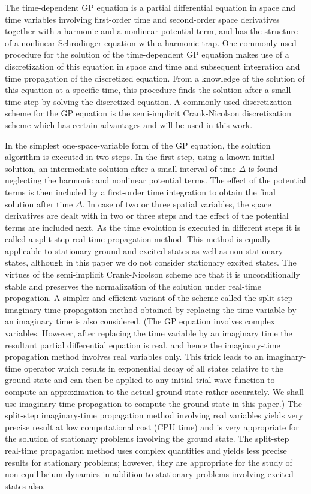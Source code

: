 \documentclass[onecolumn]{elsart3p}
\begin{document}
The time-dependent GP equation is a partial differential equation in space and
time variables involving first-order time and second-order space derivatives
together with a harmonic and a nonlinear potential term, and has the structure
of a nonlinear Schr\"odinger equation with a harmonic trap. { One
commonly used} procedure for the solution of the time-dependent GP equation makes
use of a discretization of this equation in space and time  and subsequent
integration and time propagation of the discretized equation. From a knowledge
of the solution of this equation at a specific time, this procedure finds the
solution after a small time step by solving the discretized equation.
{A commonly used} discretization scheme for the GP equation is the
semi-implicit Crank-Nicolson discretization scheme \cite{koonin,ames,dtray}
which has certain advantages and will be used in this work.


In the simplest one-space-variable form of the GP  equation, the solution
algorithm is executed in two steps. In the first step, using a known initial
solution, an intermediate solution  after a small interval of time $\Delta$ is
found   neglecting the harmonic and  nonlinear potential terms. The effect of
the potential terms is then included by a first-order time integration to obtain
the final solution after time $\Delta$. In case of two or three spatial
variables, the space derivatives are dealt with in two or three steps and the
effect of the potential terms are included next. As the time evolution is
executed  in different steps it is called a split-step real-time propagation
method. This method is equally applicable to stationary ground and 
excited states as well as non-stationary states, although in this paper 
we do not consider stationary excited states. 
The virtues of the semi-implicit Crank-Nicolson scheme
\cite{koonin,ames,dtray} are that it is  unconditionally stable and preserves the
normalization  of  the solution under real-time propagation. A simpler 
and
efficient variant of the {scheme} called the split-step
imaginary-time propagation method obtained by replacing the time variable by an
imaginary time is also considered. (The GP equation involves complex
{variables}. However, after replacing the time variable by an
imaginary time the resultant partial differential equation is real, and hence
the imaginary-time propagation method involves real {variables}
only. {This trick
leads to  an 
imaginary-time operator which results in exponential decay of all states 
relative to the   ground state and   can then be applied to any 
initial 
trial wave function to compute an approximation to the actual ground 
state rather accurately. We shall use imaginary-time propagation to 
compute the ground state in this paper.)} The split-step 
imaginary-time propagation method involving real variables
 yields very precise result at low computational cost (CPU time) and is very
appropriate for the solution of  stationary problems involving the 
ground state. The split-step 
real-time propagation method uses complex {quantities} and yields
less precise results for stationary problems; however, they are appropriate for
the study of non-equilibrium dynamics in addition to stationary problems 
involving excited states also.
\end{document}
